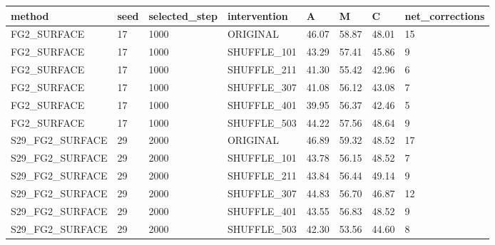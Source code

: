 \begin{tabular}{llllllll}
\toprule
method & seed & selected\_step & intervention & A & M & C & net\_corrections \\
\midrule
FG2\_SURFACE & 17 & 1000 & ORIGINAL & 46.07 & 58.87 & 48.01 & 15 \\
FG2\_SURFACE & 17 & 1000 & SHUFFLE\_101 & 43.29 & 57.41 & 45.86 & 9 \\
FG2\_SURFACE & 17 & 1000 & SHUFFLE\_211 & 41.30 & 55.42 & 42.96 & 6 \\
FG2\_SURFACE & 17 & 1000 & SHUFFLE\_307 & 41.08 & 56.12 & 43.08 & 7 \\
FG2\_SURFACE & 17 & 1000 & SHUFFLE\_401 & 39.95 & 56.37 & 42.46 & 5 \\
FG2\_SURFACE & 17 & 1000 & SHUFFLE\_503 & 44.22 & 57.56 & 48.64 & 9 \\
S29\_FG2\_SURFACE & 29 & 2000 & ORIGINAL & 46.89 & 59.32 & 48.52 & 17 \\
S29\_FG2\_SURFACE & 29 & 2000 & SHUFFLE\_101 & 43.78 & 56.15 & 48.52 & 7 \\
S29\_FG2\_SURFACE & 29 & 2000 & SHUFFLE\_211 & 43.84 & 56.44 & 49.14 & 9 \\
S29\_FG2\_SURFACE & 29 & 2000 & SHUFFLE\_307 & 44.83 & 56.70 & 46.87 & 12 \\
S29\_FG2\_SURFACE & 29 & 2000 & SHUFFLE\_401 & 43.55 & 56.83 & 48.52 & 9 \\
S29\_FG2\_SURFACE & 29 & 2000 & SHUFFLE\_503 & 42.30 & 53.56 & 44.60 & 8 \\
\bottomrule
\end{tabular}
